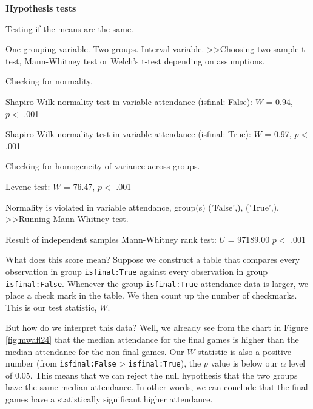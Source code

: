 \documentclass[
]{book}
\theoremstyle{definition}
\theoremstyle{definition}
\theoremstyle{definition}
\theoremstyle{definition}
\theoremstyle{remark}
\begin{document}
\begin{tcolorbox}[colback=white,
  colframe=lightgray,
  coltext=black,
  boxsep=4pt,
  boxrule=0.3pt,
  arc=0pt]
  {   \sffamily
      \color{CSblue}\textbf{Hypothesis tests}
      
      \color{CSgreen}Testing if the means are the same.
      
      One grouping variable. Two groups. Interval variable. \textgreater\textgreater  Choosing two sample t-test, Mann-Whitney test or Welch's t-test depending on assumptions.

      Checking for normality.

      \color{black}
      Shapiro-Wilk normality test in variable attendance (isfinal: False): $W$ = 0.94, $p <$ .001

      Shapiro-Wilk normality test in variable attendance (isfinal: True): $W$ = 0.97, $p <$ .001

      \color{CSgreen}
      Checking for homogeneity of variance across groups.

      \color{black}
      Levene test: $W$ = 76.47, $p <$ .001

      \color{CSgreen}
      Normality is violated in variable attendance, group(s) ('False',), ('True',). \textgreater\textgreater Running Mann-Whitney test.

      \color{black}
      Result of independent samples Mann-Whitney rank test: $U$ = 97189.00 $p <$ .001
      \normalfont
  }
\end{tcolorbox}

What does this score mean? Suppose we construct a table that compares every observation in group \texttt{isfinal:True} against every observation in group \texttt{isfinal:False}. Whenever the group \texttt{isfinal:True} attendance data is larger, we place a check mark in the table. We then count up the number of checkmarks. This is our test statistic, \(W\).

But how do we interpret this data? Well, we already see from the chart in Figure \ref{fig:mwafl24} that the median attendance for the final games is higher than the median attendance for the non-final games. Our \(W\) statistic is also a positive number (from \texttt{isfinal:False} \textgreater{} \texttt{isfinal:True}), the \(p\) value is below our \(\alpha\) level of 0.05. This means that we can reject the null hypothesis that the two groups have the same median attendance. In other words, we can conclude that the final games have a statistically significant higher attendance.
\end{document}
